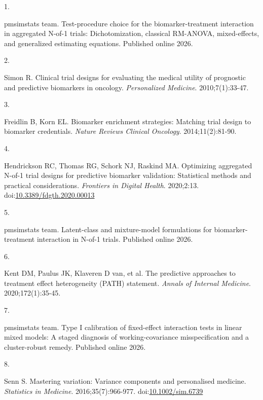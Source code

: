 \documentclass[
  11pt,
]{article}
\newlength{\cslhangindent}
\newlength{\csllabelwidth}
\newenvironment{CSLReferences}[2] %
 {\begin{list}{}{%
  \setlength{\itemindent}{0pt}
  \setlength{\leftmargin}{0pt}
  \setlength{\parsep}{0pt}
  \ifodd #1
   \setlength{\leftmargin}{\cslhangindent}
   \setlength{\itemindent}{-1\cslhangindent}
  \fi
  \setlength{\itemsep}{#2\baselineskip}}}
 {\end{list}}
\newcommand{\CSLLeftMargin}[1]{\parbox[t]{\csllabelwidth}{\strut#1\strut}}
\newcommand{\CSLRightInline}[1]{\parbox[t]{\linewidth - \csllabelwidth}{\strut#1\strut}}
\begin{document}
\protect{}\label{refs}
\begin{CSLReferences}{0}{1}
\CSLLeftMargin{1. }%
\CSLRightInline{{pmsimstats team}. Test-procedure choice for the
biomarker-treatment interaction in aggregated {N}-of-1 trials:
Dichotomization, classical {RM-ANOVA}, mixed-effects, and generalized
estimating equations. Published online 2026.}

\CSLLeftMargin{2. }%
\CSLRightInline{Simon R. Clinical trial designs for evaluating the
medical utility of prognostic and predictive biomarkers in oncology.
\emph{Personalized Medicine}. 2010;7(1):33-47.}

\CSLLeftMargin{3. }%
\CSLRightInline{Freidlin B, Korn EL. Biomarker enrichment strategies:
Matching trial design to biomarker credentials. \emph{Nature Reviews
Clinical Oncology}. 2014;11(2):81-90.}

\CSLLeftMargin{4. }%
\CSLRightInline{Hendrickson RC, Thomas RG, Schork NJ, Raskind MA.
Optimizing aggregated {N}-of-1 trial designs for predictive biomarker
validation: Statistical methods and practical considerations.
\emph{Frontiers in Digital Health}. 2020;2:13.
doi:\href{https://doi.org/10.3389/fdgth.2020.00013}{10.3389/fdgth.2020.00013}}

\CSLLeftMargin{5. }%
\CSLRightInline{{pmsimstats team}. Latent-class and mixture-model
formulations for biomarker-treatment interaction in {N}-of-1 trials.
Published online 2026.}

\CSLLeftMargin{6. }%
\CSLRightInline{{Kent DM, Paulus JK, Klaveren D van, et al.} The
predictive approaches to treatment effect heterogeneity ({PATH})
statement. \emph{Annals of Internal Medicine}. 2020;172(1):35-45.}

\CSLLeftMargin{7. }%
\CSLRightInline{{pmsimstats team}. Type {I} calibration of fixed-effect
interaction tests in linear mixed models: A staged diagnosis of
working-covariance misspecification and a cluster-robust remedy.
Published online 2026.}

\CSLLeftMargin{8. }%
\CSLRightInline{Senn S. Mastering variation: Variance components and
personalised medicine. \emph{Statistics in Medicine}.
2016;35(7):966-977.
doi:\href{https://doi.org/10.1002/sim.6739}{10.1002/sim.6739}}


\end{CSLReferences}
\end{document}
